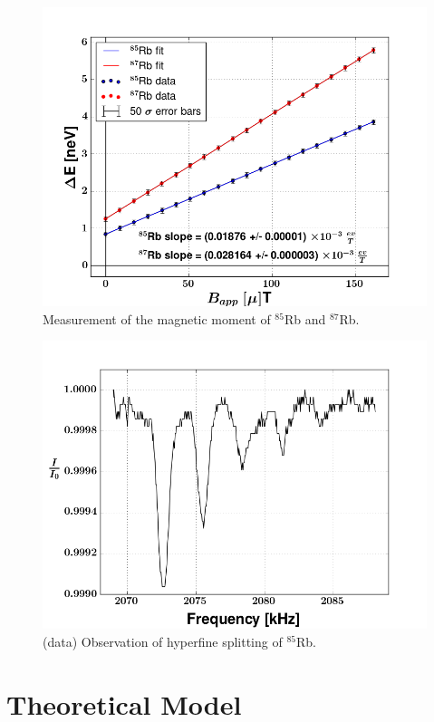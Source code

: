 \documentclass[aps,prl,twocolumn,groupedaddress]{revtex4-1}
\begin{document}
\begin{figure}
\includegraphics[width=\columnwidth]{magmom-verterr.png}
\caption{\label{MagMom} Measurement of the magnetic moment of $^{85}$Rb and $^{87}$Rb.}
\end{figure}

\begin{figure}
\includegraphics[width=\columnwidth]{rb85-hyperfine_split.png}
\caption{\label{HyperFineSplit} (data) Observation of hyperfine splitting of $^{85}$Rb.}
\end{figure}

\section{Theoretical Model}
\end{document}

